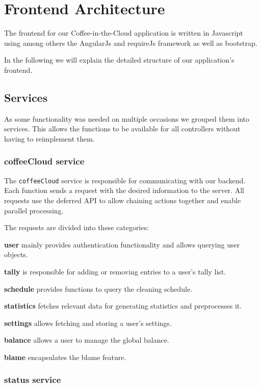 \newpage
\section{Frontend Architecture}\label{frontend-architecture}

The frontend for our Coffee-in-the-Cloud application is written in
Javascript using among others the AngularJs and requireJs framework as
well as bootstrap.

In the following we will explain the detailed structure of our
application's frontend.

\subsection{Services}\label{services}

As some functionality was needed on multiple occasions we grouped them
into services. This allows the functions to be available for all
controllers without having to reimplement them.

\subsubsection{coffeeCloud service}\label{coffeecloud-service}

The \texttt{coffeeCloud} service is responsible for communicating with
our backend. Each function sends a request with the desired information
to the server. All requests use the deferred API to allow chaining
actions together and enable parallel processing.

The requests are divided into these categories:

\textbf{user} mainly provides authentication functionality and allows
querying user objects.

\textbf{tally} is responsible for adding or removing entries to a user's
tally list.

\textbf{schedule} provides functions to query the cleaning schedule.

\textbf{statistics} fetches relevant data for generating statistics and
preprocesses it.

\textbf{settings} allows fetching and storing a user's settings.

\textbf{balance} allows a user to manage the global balance.

\textbf{blame} encapsulates the blame feature.

\subsubsection{status service}\label{status-service}

